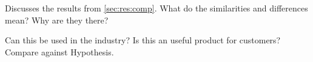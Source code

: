 Discusses the results from \autoref{sec:res:comp}. What do the similarities and differences mean? Why are they there?

Can this be used in the industry? Is this an useful product for customers? Compare against Hypothesis. 
